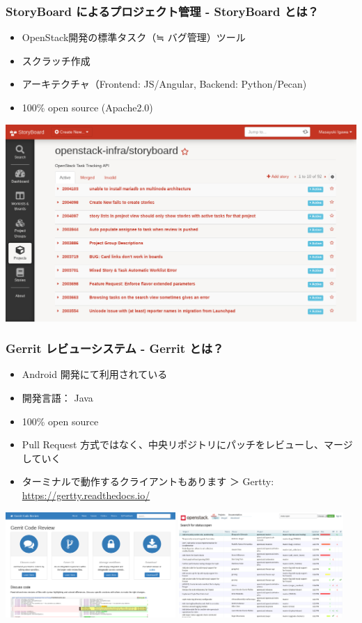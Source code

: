 \documentclass[aspectratio=169,11pt,hyperref={colorlinks=true}]{beamer}
\begin{document}
\begin{frame}
  \frametitle{StoryBoard によるプロジェクト管理 - StoryBoard とは？}
  \begin{itemize}
    \item OpenStack開発の標準タスク（≒ バグ管理）ツール
    \item スクラッチ作成
    \item アーキテクチャ（Frontend: JS/Angular, Backend: Python/Pecan)
    \item 100\% open source (Apache2.0)
  \end{itemize}
  \centering\includegraphics[scale=0.2]{images/storyboard.png}
\end{frame}

\begin{frame}
  \frametitle{Gerrit レビューシステム - Gerrit とは？}
  \begin{itemize}
    \item Android 開発にて利用されている
    \item 開発言語： Java
    \item 100\% open source
    \item Pull Request 方式ではなく、中央リポジトリにパッチをレビューし、マージしていく
    \item ターミナルで動作するクライアントもあります ＞ Gertty: \url{https://gertty.readthedocs.io/}
  \end{itemize}
  \centering
  \includegraphics[height=40mm]{images/gerritcodereview-com.png}
  \includegraphics[height=40mm]{images/review-openstack-org.png}
\end{frame}
\end{document}

